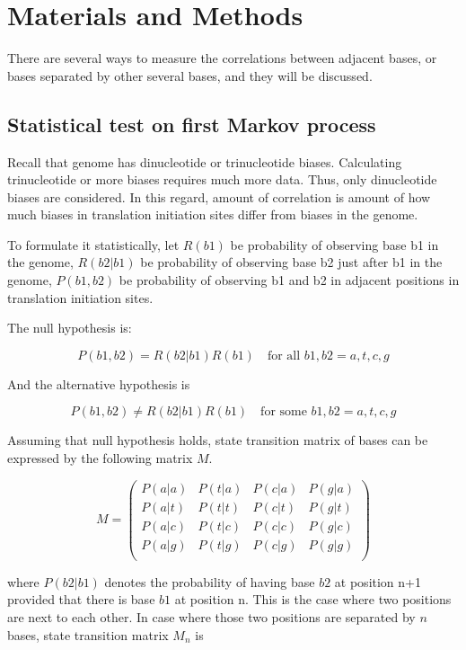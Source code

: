 \section{Materials and Methods}
\label{cor_mat_meth}

There are several ways to measure the correlations between adjacent
bases, or bases separated by other several bases, and they will be
discussed.

\subsection{Statistical test on first Markov process}

Recall that genome has dinucleotide or trinucleotide
biases\cite{label301}. Calculating trinucleotide or more biases
requires much more data. Thus, only dinucleotide biases are considered. 
In this regard, amount of correlation is amount of how much biases in
translation initiation sites differ from biases in the genome.

To formulate it statistically, let \(R(b1)\) be probability of observing
base b1 in the genome, \(R(b2|b1)\) be probability of observing base b2
just after b1 in the genome, \(P(b1, b2)\) be probability of observing
b1 and b2 in adjacent positions in translation initiation sites.

The null hypothesis is:

\[
 P(b1, b2)=R(b2|b1)R(b1) \quad \mbox{for all }b1, b2 = a,t,c,g
\]



And the alternative hypothesis is

\[
 P(b1, b2) \neq R(b2|b1)R(b1) \quad \mbox{for some }b1,b2 = a,t,c,g
\]

Assuming that null hypothesis holds, state
transition matrix of bases can be expressed by the following matrix
\(M\).

\[ M = \left(
 \begin{array}{cccc}
 P(a|a) &  P(t|a) &  P(c|a) &  P(g|a) \\ 
 P(a|t) &  P(t|t) &  P(c|t) &  P(g|t) \\ 
 P(a|c) &  P(t|c) &  P(c|c) &  P(g|c) \\ 
 P(a|g) &  P(t|g) &  P(c|g) &  P(g|g) \\ 
 \end{array}
 \right) 
\]

where \(P(b2|b1)\) denotes the probability of having base \(b2\) at
position n+1 provided that there is base \(b1\) at position n. This is
the case where two positions are next to each other. In case where
those two positions are separated by \(n\) bases, state transition
matrix \(M_{n}\) is

